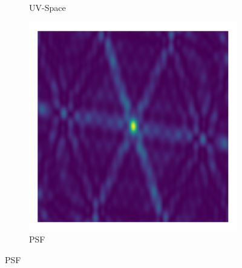 \begin{figure}[h!]
\begin{subfigure}[b]{0.28\linewidth}
		\caption{UV-Space}
	\end{subfigure}
	\begin{subfigure}[b]{0.28\linewidth}
		\includegraphics[width=\linewidth, trim={18px 19px 18px 18px}, clip]{./chapters/01.intro/img/psf.png}
		\caption{PSF}
	\end{subfigure}


\end{figure}
